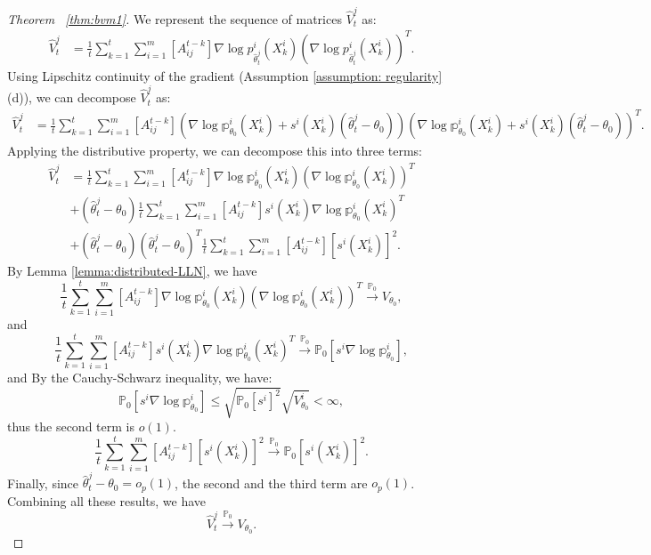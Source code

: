 \documentclass[twoside,11pt]{article}
\numberwithin{equation}{section}
\newcommand\bP{\mathbb{P}}
\newcommand\bp{\mathbb{p}}
\newcommand{\pto}{\stackrel{\bP_0}{\to}}
\begin{document}
{\begin{proof}[Theorem ~\ref{thm:bvm1}]
 We represent the sequence of matrices $\hat V_t^j$ as:
\begin{align*}
    \hat V_t^j &= \frac{1}{t} \sum_{k = 1}^t \sum_{i = 1}^m [A^{t - k}_{ij}]     \nabla \log p_{\hat \theta_t^j}^i(X_k^i)   \left(\nabla \log p_{\hat \theta_t^j}^i(X_k^i)\right)^T .
\end{align*}
Using Lipschitz continuity of the gradient (Assumption \ref{assumption: regularity}(d)), we can decompose $\hat V_t^j$ as:
\begin{align*}
    \hat V_t^j   &=  \frac{1}{t} \sum_{k = 1}^t \sum_{i = 1}^m [A^{t - k}_{ij}]     \left( \nabla \log \bp_{\theta_0}^i(X_k^i)  +s^i(X_k^i)(\hat \theta_t^j - \theta_0) \right) \left( \nabla \log \bp_{\theta_0}^i(X_k^i)  +s^i(X_k^i)(\hat \theta_t^j - \theta_0) \right)^T . 
\end{align*}
Applying the distributive property, we can decompose this into three terms:
\begin{align*}
    \hat V_t^j &=\frac{1}{t} \sum_{k = 1}^t \sum_{i = 1}^m [A^{t - k}_{ij}]  \nabla \log \bp_{\theta_0}^i(X_k^i) \left(\nabla \log \bp_{\theta_0}^i(X_k^i) \right)^T \\
    &+ (\hat \theta_t^j - \theta_0) \frac{1}{t} \sum_{k = 1}^t \sum_{i = 1}^m [A^{t - k}_{ij}]  s^i(X_k^i) \nabla \log \bp_{\theta_0}^i(X_k^i)^T  \\
    &+ (\hat \theta_t^j - \theta_0)  (\hat \theta_t^j - \theta_0)^T \frac{1}{t} \sum_{k = 1}^t \sum_{i = 1}^m [A^{t - k}_{ij}]  [s^i(X_k^i)]^2. 
\end{align*}
By Lemma \ref{lemma:distributed-LLN}, we have
\begin{equation*}
    \frac{1}{t} \sum_{k = 1}^t \sum_{i = 1}^m [A^{t - k}_{ij}]  \nabla \log \bp_{\theta_0}^i(X_k^i) \left(\nabla \log \bp_{\theta_0}^i(X_k^i) \right)^T  \pto V_{\theta_0}, 
\end{equation*}
and 
\begin{equation*}
    \frac{1}{t} \sum_{k = 1}^t \sum_{i = 1}^m [A^{t - k}_{ij}]  s^i(X_k^i) \nabla \log \bp_{\theta_0}^i(X_k^i)^T  \pto \bP_0[s^i \nabla \log \bp_{\theta_0}^i], 
\end{equation*}
and 
By the Cauchy-Schwarz inequality, we have:
\begin{equation*}
\bP_0[s^i \nabla \log \bp_{\theta_0}^i] \leq \sqrt{\bP_0 [s^i]^2} \sqrt{V_{\theta_0}^i} < \infty,
\end{equation*}
thus the second term is $o(1)$. 
\begin{equation*}
    \frac{1}{t} \sum_{k = 1}^t \sum_{i = 1}^m [A^{t - k}_{ij}]  [s^i(X_k^i)]^2 \pto \bP_0 [s^i(X_k^i)]^2. 
\end{equation*}
Finally, since $\hat \theta_t^j - \theta_0 = o_p(1)$, the second and the third term are $o_p(1)$. Combining all these results, we have
\begin{equation*}
\hat V_t^j \pto V_{\theta_0}.
\end{equation*}


\end{proof}}
\end{document}
